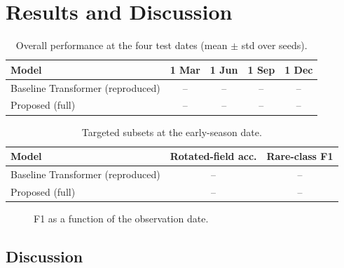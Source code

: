 \section{Results and Discussion}
\label{sec:results}

\begin{table}[t]
\caption{Overall performance at the four test dates (mean $\pm$ std over seeds). \pending}
\label{tab:main}
\centering
\begin{tabular}{lcccc}
\toprule
Model & 1 Mar & 1 Jun & 1 Sep & 1 Dec \\
\midrule
Baseline Transformer (reproduced) & -- & -- & -- & -- \\
Proposed (full) & -- & -- & -- & -- \\
\bottomrule
\end{tabular}
\end{table}

\begin{table}[t]
\caption{Targeted subsets at the early-season date. \pending}
\label{tab:subsets}
\centering
\begin{tabular}{lcc}
\toprule
Model & Rotated-field acc. & Rare-class F1 \\
\midrule
Baseline Transformer (reproduced) & -- & -- \\
Proposed (full) & -- & -- \\
\bottomrule
\end{tabular}
\end{table}

\begin{figure}[t]
\centering
{}
\caption{F1 as a function of the observation date. \pending}
\label{fig:f1doy}
\end{figure}

\subsection{Discussion}
